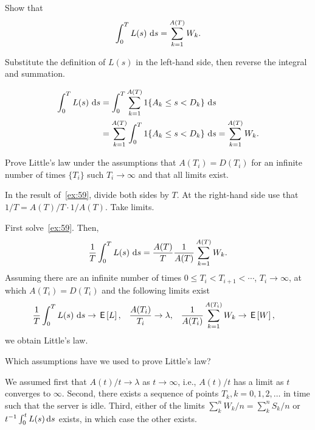 \begin{extra}
 Show that 
\begin{equation*}
 \int_0^T L(s)\, \,\text{d}s = \sum_{k=1}^{A(T)} W_k.
\end{equation*}
\begin{hint}
 Substitute the definition of $L(s)$ in the left-hand side, then reverse the integral and summation.
\end{hint}
\begin{solution}
\begin{equation*}
 \begin{split}
 \int_0^T L(s)\, \,\text{d}s & = \int_0^T \sum_{k=1}^{A(T)} 1\{A_k \leq s < D_k\} \, \,\text{d}s \\
& = \sum_{k=1}^{A(T)}\int_0^T 1\{A_k \leq s < D_k\} \, \,\text{d}s = \sum_{k=1}^{A(T)} W_k.
 \end{split}
\end{equation*}
\end{solution}
\end{extra}

\begin{exercise}
 Prove Little's law under the assumptions that $A(T_i) = D(T_i)$ for an infinite number of times $\{T_i\}$ such $T_i\to\infty$ and that all limits exist. 
\begin{hint}
In  the result of~\cref{ex:59},  divide both sides by $T$. At the right-hand side use that $1/T = A(T)/T \cdot 1/A(T)$. Take limits.
\end{hint}
\begin{solution}
  First solve~\cref{ex:59}. Then,
\begin{equation*}
 \frac 1 T \int_0^T L(s)\, \,\text{d}s = \frac{A(T)} T \frac{1}{A(T)} \sum_{k=1}^{A(T)} W_k.
\end{equation*}
Assuming there are an infinite number of times
$0\leq T_i<T_{i+1}<\cdots$, $T_i\to\infty$, at which $A(T_i) = D(T_i)$
and the following limits exist
\begin{align*}
\frac 1 T \int_0^T L(s)\, \,\text{d}s &\to \,\mathsf{E}\left[L\right],&
\frac{A(T_i)}{T_i} &\to \lambda, &
\frac{1}{A(T_i)} \sum_{k=1}^{A(T_i)} W_k &\to \,\mathsf{E}\left[W\right],
\end{align*}
we obtain Little's law.

\end{solution}
\end{exercise}


\begin{extra}
 Which assumptions have we used to prove Little's law?
\begin{solution}
 We assumed first that $A(t)/t \to \lambda$ as $t\to \infty$, i.e., $A(t)/t$ has a limit as $t$ converges to $\infty$.
 Second, there exists a sequence of points $T_k, k=0,1,2,\ldots$ in time such that the server is idle.
 Third, either of the limits $\sum_k^n W_k/n = \sum_k^n S_k /n $ or $t^{-1}\int_0^t L(s) \,\text{d}s$ exists, in which case the other exists.
\end{solution}
\end{extra}

